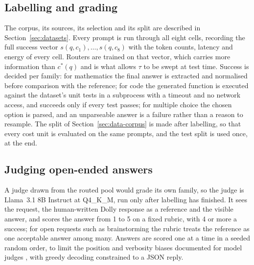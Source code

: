 \documentclass[final,5p,times,twocolumn]{elsarticle}
\theoremstyle{plain}
\newcommand{\cstar}{c^{*}}
\begin{document}
\subsection{Labelling and grading}
\label{sec:setup-labels}

The corpus, its sources, its selection and its split are described in
Section~\ref{sec:datasets}. Every prompt is run through all eight cells, recording the full success
vector $s(q, c_1), \dots, s(q, c_8)$ with the token counts, latency and
energy of every cell. Routers are trained on that vector, which carries more
information than $\cstar(q)$ and is what allows $\tau$ to be swept at test
time. Success is decided per family: for mathematics the final answer is
extracted and normalised before comparison with the reference; for code the
generated function is executed against the dataset's unit tests in a
subprocess with a timeout and no network access, and succeeds only if every
test passes; for multiple choice the chosen option is parsed, and an
unparseable answer is a failure rather than a reason to resample. The split
of Section~\ref{sec:data-corpus} is made after labelling, so that every cost
unit is evaluated on the same prompts, and the test split is used once, at
the end.

\subsection{Judging open-ended answers}
\label{sec:setup-judge}

A judge drawn from the routed pool would grade its own family, so the judge
is Llama~3.1 8B Instruct \cite{grattafiori2024llama3} at Q4\_K\_M, run only
after labelling has finished. It sees the request, the human-written Dolly
response as a reference and the visible answer, and scores the answer from 1
to 5 on a fixed rubric, with 4 or more a success; for open requests such as
brainstorming the rubric treats the reference as one acceptable answer among
many. Answers are scored one at a time in a seeded random order, to limit the
position and verbosity biases documented for model judges
\cite{zheng2023judging}, with greedy decoding constrained to a JSON reply.
\end{document}
